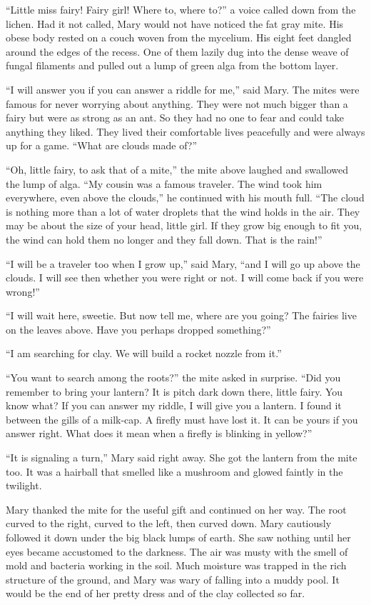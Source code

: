 \documentclass[10pt]{memoir}
\begin{document}
``Little miss fairy! Fairy girl! Where to, where to?'' a voice called down from
the lichen. Had it not called, Mary would not have noticed the fat gray mite.
His obese body rested on a couch woven from the mycelium. His eight feet
dangled around the edges of the recess. One of them lazily dug into the dense
weave of fungal filaments and pulled out a lump of green alga from the bottom
layer.

``I will answer you if you can answer a riddle for me,'' said Mary. The mites
were famous for never worrying about anything. They were not much bigger than a
fairy but were as strong as an ant. So they had no one to fear and could take
anything they liked. They lived their comfortable lives peacefully and were
always up for a game. ``What are clouds made of?''

``Oh, little fairy, to ask that of a mite,'' the mite above laughed and
swallowed the lump of alga. ``My cousin was a famous traveler. The wind took
him everywhere, even above the clouds,'' he continued with his mouth full.
``The cloud is nothing more than a lot of water droplets that the wind holds in
the air. They may be about the size of your head, little girl. If they grow big
enough to fit you, the wind can hold them no longer and they fall down. That is
the rain!''

``I will be a traveler too when I grow up,'' said Mary, ``and I will go up
above the clouds. I will see then whether you were right or not. I will come
back if you were wrong!''

``I will wait here, sweetie. But now tell me, where are you going? The fairies
live on the leaves above. Have you perhaps dropped something?''

``I am searching for clay. We will build a rocket nozzle from it.''

``You want to search among the roots?'' the mite asked in surprise. ``Did you
remember to bring your lantern? It is pitch dark down there, little fairy. You
know what? If you can answer my riddle, I will give you a lantern. I found it
between the gills of a milk-cap. A firefly must have lost it. It can be yours
if you answer right. What does it mean when a firefly is blinking in yellow?''

``It is signaling a turn,'' Mary said right away. She got the lantern from the
mite too. It was a hairball that smelled like a mushroom and glowed faintly in
the twilight.

Mary thanked the mite for the useful gift and continued on her way. The root
curved to the right, curved to the left, then curved down. Mary cautiously
followed it down under the big black lumps of earth. She saw nothing until her
eyes became accustomed to the darkness. The air was musty with the smell of
mold and bacteria working in the soil. Much moisture was trapped in the rich
structure of the ground, and Mary was wary of falling into a muddy pool. It
would be the end of her pretty dress and of the clay collected so far.
\end{document}
